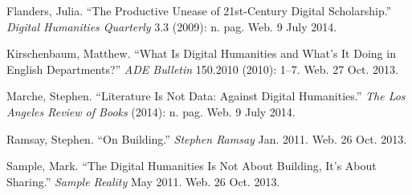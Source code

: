 \documentclass[]{article}
\begin{document}
Flanders, Julia. ``The Productive Unease of 21st-Century Digital
Scholarship.'' \emph{Digital Humanities Quarterly} 3.3 (2009): n. pag.
Web. 9 July 2014.

Kirschenbaum, Matthew. ``What Is Digital Humanities and What's It Doing
in English Departments?'' \emph{ADE Bulletin} 150.2010 (2010): 1--7.
Web. 27 Oct. 2013.

Marche, Stephen. ``Literature Is Not Data: Against Digital Humanities.''
\emph{The Los Angeles Review of Books} (2014): n. pag. Web. 9 July 2014.

Ramsay, Stephen. ``On Building.'' \emph{Stephen Ramsay} Jan. 2011. Web.
26 Oct. 2013.

Sample, Mark. ``The Digital Humanities Is Not About Building, It's About
Sharing.'' \emph{Sample Reality} May 2011. Web. 26 Oct. 2013.
\end{document}
